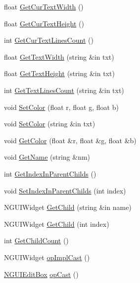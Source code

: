 \begin{DoxyCompactItemize}
float \hyperlink{class_n_g_u_i_edit_box_ae6959babd5ff1b9ed009010954e3dc4e}{Get\+Cur\+Text\+Width} ()
\item 
float \hyperlink{class_n_g_u_i_edit_box_a39059c31599ae1e142c98a42eec77aee}{Get\+Cur\+Text\+Height} ()
\item 
int \hyperlink{class_n_g_u_i_edit_box_adc5538b0647a8302d0b782a85975557b}{Get\+Cur\+Text\+Lines\+Count} ()
\item 
float \hyperlink{class_n_g_u_i_edit_box_aa8e86beb9f031e7fb1be1295cc223286}{Get\+Text\+Width} (string \&in txt)
\item 
float \hyperlink{class_n_g_u_i_edit_box_a024e6ce73b95e94b0ec2c3e37cb5ed27}{Get\+Text\+Height} (string \&in txt)
\item 
int \hyperlink{class_n_g_u_i_edit_box_aa530e61a48a25e6a3184ea386162445d}{Get\+Text\+Lines\+Count} (string \&in txt)
\item 
void \hyperlink{class_n_g_u_i_edit_box_a097ba0fb443abe1b4bf93a2758f374c7}{Set\+Color} (float r, float g, float b)
\item 
void \hyperlink{class_n_g_u_i_edit_box_a1134fda718dcb7e9f3e0116a3ac9707b}{Set\+Color} (string \&in txt)
\item 
void \hyperlink{class_n_g_u_i_edit_box_aa54ed834ec03fd24f1f75fbbace4f2a1}{Get\+Color} (float \&r, float \&g, float \&b)
\item 
void \hyperlink{class_n_g_u_i_edit_box_a9f4f53fedd16e1ed7de9e1d16c01d83c}{Get\+Name} (string \&nm)
\item 
int \hyperlink{class_n_g_u_i_edit_box_a678fb3a87a38522fdda3c9b1475ed0de}{Get\+Index\+In\+Parent\+Childs} ()
\item 
void \hyperlink{class_n_g_u_i_edit_box_adc6dfcf7ba83b8a7025f3dbefaeeaab8}{Set\+Index\+In\+Parent\+Childs} (int index)
\item 
N\+G\+U\+I\+Widget \hyperlink{class_n_g_u_i_edit_box_a74a547d2048fcddbff60e16ce2afeca9}{Get\+Child} (string \&in name)
\item 
N\+G\+U\+I\+Widget \hyperlink{class_n_g_u_i_edit_box_a27aa26e1ea0f622e22621cb9c96f0992}{Get\+Child} (int index)
\item 
int \hyperlink{class_n_g_u_i_edit_box_a68f4a76c7af7575cb959cf3f34ecaa3e}{Get\+Child\+Count} ()
\item 
N\+G\+U\+I\+Widget \hyperlink{class_n_g_u_i_edit_box_a567fb6b20702ed4de15b4c02d24693f1}{op\+Impl\+Cast} ()
\item 
\hyperlink{class_n_g_u_i_edit_box}{N\+G\+U\+I\+Edit\+Box} \hyperlink{class_n_g_u_i_edit_box_a8460ddecf39424726382bd14aae39b4f}{op\+Cast} ()

\end{DoxyCompactItemize}
